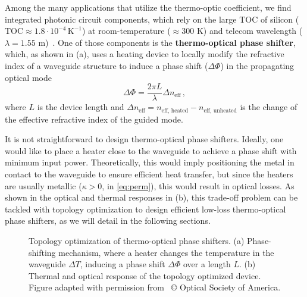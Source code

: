 Among the many applications that utilize the thermo-optic coefficient, we find integrated photonic circuit components, which rely on the large 
TOC of silicon ($\text{TOC} \approx 1.8 \cdot 10^{-4}\, \text{K}^{-1}$) at room-temperature ($\approx300$ K) and telecom wavelength 
($\lambda=1.55$ \textmu m)~\cite{thermo-optic-coef}. One of those components is the \textbf{thermo-optical phase shifter}, which, as shown in  (a),
uses a heating device to locally modify the refractive index of a waveguide structure to induce a phase shift ($\Delta \Phi$) in the propagating optical mode
\begin{equation}\label{eq:phase_shift}
\Delta \Phi = \frac{2\pi L}{\lambda} \Delta n_\text{eff}\,,
\end{equation}
where $L$ is the device length and $\Delta n_\text{eff} = n_\text{eff, heated} - n_\text{eff, unheated}$
 is the change of the effective refractive index of the guided mode. 
 
 It is not straightforward to design thermo-optical phase shifters. Ideally, one would like to place a heater close to the waveguide to achieve a phase shift with minimum input power.
 Theoretically, this would imply positioning the metal in contact to the waveguide to ensure efficient heat transfer, but since the heaters are usually metallic ($\kappa > 0$, in \eqref{eq:perm}), this would result
 in optical losses. As shown in the optical and thermal responses in  (b), this trade-off problem can be tackled with topology optimization to design efficient low-loss thermo-optical phase shifters, 
 as we will detail in the following sections.

\begin{figure}[tb]
    \centering
    \caption{Topology optimization of thermo-optical phase shifters. (a) Phase-shifting mechanism, where a heater changes the temperature in the waveguide $\Delta T$, inducing a phase shift
    $\Delta \Phi$ over a length $L$. (b) Thermal and optical response of the topology optimized device. Figure adapted with permission from~\cite{ownpub0} © Optical Society of America.}
    \label{fig:thermo_res}
\end{figure}


